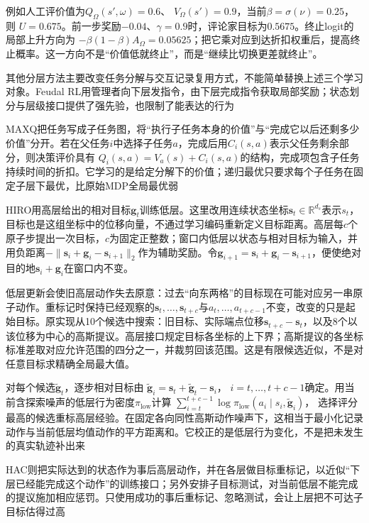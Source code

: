 例如人工评价值为$Q_\Omega(s',\omega)=0.6$、
$V_\Omega(s')=0.9$，当前$\beta=\sigma(\nu)=0.25$，则
$U=0.675$。前一步奖励$-0.04$、$\gamma=0.9$时，评论家目标为$0.5675$。终止logit的局部上升方向为
$-\beta(1-\beta)A_\Omega=0.05625$；把它乘对应到达折扣权重后，提高终止概率。这一方向不是“价值低就终止”，而是“继续比切换更差就终止”。

其他分层方法主要改变任务分解与交互记录复用方式，不能简单替换上述三个学习对象。Feudal RL用管理者向下层发指令，由下层完成指令获取局部奖励；状态划分与层级接口提供了强先验，也限制了能表达的行为

MAXQ把任务写成子任务图，将“执行子任务本身的价值”与“完成它以后还剩多少价值”分开。若在父任务$i$中选择子任务$a$，完成后用$C_i(s,a)$表示父任务剩余部分，则决策评价具有
$Q_i(s,a)=V_a(s)+C_i(s,a)$的结构，完成项包含子任务持续时间的折扣。它学习的是给定分解下的价值；递归最优只要求每个子任务在固定子层下最优，比原始MDP全局最优弱

HIRO用高层给出的相对目标$\bm g_t$训练低层。这里改用连续状态坐标$\bm s_t\in\mathbb R^{d_s}$表示$s_t$，目标也是这组坐标中的位移向量，不通过学习编码重新定义目标距离。高层每$c$个原子步提出一次目标，$c$为固定正整数；窗口内低层以状态与相对目标为输入，并用负距离$-\lVert\bm s_i+\bm g_i-\bm s_{i+1}\rVert_2$作为辅助奖励。令$\bm g_{i+1}=\bm s_i+\bm g_i-\bm s_{i+1}$，便使绝对目的地$\bm s_i+\bm g_i$在窗口内不变。

低层更新会使旧高层动作失去原意：过去“向东两格”的目标现在可能对应另一串原子动作。重标记时保持已经观察的$\bm s_t,\ldots,\bm s_{t+c}$与$a_t,\ldots,a_{t+c-1}$不变，改变的只是起始目标。原实现从10个候选中搜索：旧目标、实际端点位移$\bm s_{t+c}-\bm s_t$，以及8个以该位移为中心的高斯提议。高层接口规定目标各坐标的上下界；高斯提议的各坐标标准差取对应允许范围的四分之一，并裁剪回该范围。这是有限候选近似，不是对任意目标求精确全局最大值。

对每个候选$\widetilde{\bm g}_t$，逐步相对目标由
$\widetilde{\bm g}_i=\bm s_t+\widetilde{\bm g}_t-\bm s_i$，
$i=t,\ldots,t+c-1$确定。用当前含探索噪声的低层行为密度$\pi_{\mathrm{low}}$计算
$\sum_{i=t}^{t+c-1}\log\pi_{\mathrm{low}}
(a_i\mid s_i,\widetilde{\bm g}_i)$，
选择评分最高的候选重标高层经验。在固定各向同性高斯动作噪声下，这相当于最小化记录动作与当前低层均值动作的平方距离和。它校正的是低层行为变化，不是把未发生的真实轨迹补出来

HAC则把实际达到的状态作为事后高层动作，并在各层做目标重标记，以近似“下层已经能完成这个动作”的训练接口；另外安排子目标测试，对当前低层不能完成的提议施加相应惩罚。只使用成功的事后重标记、忽略测试，会让上层把不可达子目标估得过高

